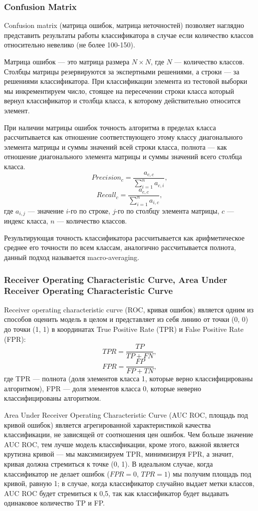 \documentclass[14pt, a4paper, oneside]{extarticle}
\begin{document}
\subsubsection{Confusion Matrix}
Confusion matrix (матрица ошибок, матрица неточностей) позволяет наглядно представить результаты работы классификатора в случае если количество классов относительно невелико (не более 100-150).

Матрица ошибок --- это матрица размера $N \times N$, где $N$ --- количество классов. Столбцы матрицы резервируются за экспертными решениями, а строки --- за решениями классификатора. При классификации элемента из тестовой выборки мы инкрементируем число, стоящее на пересечении строки класса который вернул классификатор и столбца класса, к которому действительно относится элемент.

При наличии матрицы ошибок точность алгоритма в пределах класса рассчитывается как отношение соответствующего этому классу диагонального элемента матрицы и суммы значений всей строки класса, полнота --- как отношение диагонального элемента матрицы и суммы значений всего столбца класса.
$$Precision_c = \frac{a_{c,c}}{\sum_{i=1}^{n} a_{c,i}},$$
$$Recall_c = \frac{a_{c,c}}{\sum_{i=1}^{n} a_{i,c}},$$
где $a_{i,j}$ --- значение $i$-го по строке, $j$-го по столбцу элемента матрицы, $c$ --- индекс класса, $n$ --- количество классов.

Результирующая точность классификатора рассчитывается как арифметическое среднее его точности по всем классам, аналогично рассчитывается полнота, данный подход называется macro-averaging.

\subsubsection{Receiver Operating Characteristic Curve, Area Under Receiver Operating Characteristic Curve}
Receiver operating characteristic curve (ROC, кривая ошибок) является одним из способов оценить модель в целом и представляет из себя линию от точки (0, 0) до точки (1, 1) в координатах True Positive Rate (TPR) и False Positive Rate (FPR):
$$TPR = \frac{TP}{TP+FN},$$
$$FPR = \frac{FP}{FP+TN},$$
где TPR --- полнота (доля элементов класса 1, которые верно классифицированы алгоритмом), FPR --- доля элементов класса 0, которые неверно классифицированы алгоритмом.

Area Under Receiver Operating Characteristic Curve (AUC ROC, площадь под кривой ошибок) является агрегированной характеристикой качества классификации, не зависящей от соотношения цен ошибок. Чем больше значение AUC ROC, тем лучше модель классификации, кроме этого, важной является крутизна кривой --- мы максимизируем TPR, минимизируя FPR, а значит, кривая должна стремиться к точке (0, 1). В идеальном случае, когда классификатор не делает ошибок ($FPR = 0$, $TPR = 1$) мы получим площадь под кривой, равную 1; в случае, когда классификатор случайно выдает метки классов, AUC ROC будет стремиться к 0,5, так как классификатор будет выдавать одинаковое количество TP и FP.
\end{document}
